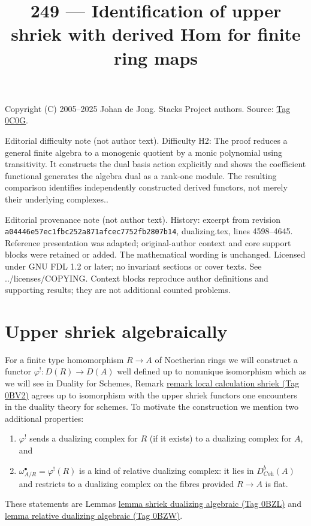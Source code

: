 \documentclass{amsart}
\theoremstyle{plain}
\theoremstyle{definition}
\theoremstyle{remark}
\numberwithin{equation}{subsection}
\begin{document}
\title[Stacks Project, Tag 0C0G]{249 --- Identification of upper shriek with derived Hom for finite ring maps}
\maketitle
\noindent Copyright (C) 2005--2025 Johan de Jong. Stacks Project authors. Source: \href{https://stacks.math.columbia.edu/tag/0C0G}{Tag 0C0G}.

\noindent Editorial difficulty note (not author text). Difficulty H2: The proof reduces a general finite algebra to a monogenic quotient by a monic polynomial using transitivity. It constructs the dual basis action explicitly and shows the coefficient functional generates the algebra dual as a rank-one module. The resulting comparison identifies independently constructed derived functors, not merely their underlying complexes..

\noindent Editorial provenance note (not author text). History: excerpt from revision \texttt{a0444\allowbreak 6e57e\allowbreak c1fbc\allowbreak 252a8\allowbreak 71afc\allowbreak ec775\allowbreak 2fb28\allowbreak 07b14}, dualizing.tex, lines 4598--4645. Reference presentation was adapted; original-author context and core support blocks were retained or added. The mathematical wording is unchanged. Licensed under GNU FDL 1.2 or later; no invariant sections or cover texts. See ../licenses/COPYING. Context blocks reproduce author definitions and supporting results; they are not additional counted problems.

\section{Upper shriek algebraically}
\label{section-relative-dualizing-complex-algebraic}

\noindent
For a finite type homomorphism $R \to A$ of Noetherian rings
we will construct a functor $\varphi^! : D(R) \to D(A)$
well defined up to nonunique isomorphism which
as we will see in Duality for Schemes, Remark
\href{https://stacks.math.columbia.edu/tag/0BV2}{remark local calculation shriek (Tag 0BV2)}
agrees up to isomorphism with the upper shriek functors
one encounters in the duality theory for schemes.
To motivate the construction we mention two additional properties:
\begin{enumerate}
\item $\varphi^!$ sends a dualizing complex for $R$ (if it exists)
to a dualizing complex for $A$, and
\item $\omega_{A/R}^\bullet = \varphi^!(R)$ is a kind of
relative dualizing complex: it lies in $D^b_{\textit{Coh}}(A)$ and restricts
to a dualizing complex on the fibres provided $R \to A$ is flat.
\end{enumerate}
These statements are Lemmas \href{https://stacks.math.columbia.edu/tag/0BZL}{lemma shriek dualizing algebraic (Tag 0BZL)} and
\href{https://stacks.math.columbia.edu/tag/0BZW}{lemma relative dualizing algebraic (Tag 0BZW)}.
\end{document}

